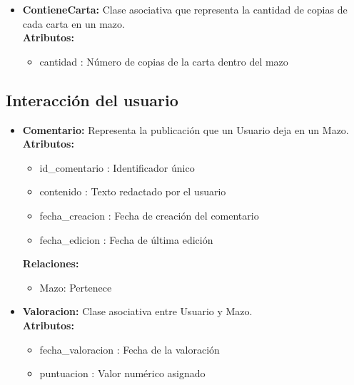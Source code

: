 \documentclass[10pt]{article}
\begin{document}
\begin{itemize}
            \item \textbf{ContieneCarta:} Clase asociativa que representa la cantidad de copias de cada carta en un mazo.\\
            \textbf{Atributos:}
            \begin{itemize}
                \item cantidad : Número de copias de la carta dentro del mazo
            \end{itemize}
        \end{itemize}
        
        \subsection{Interacción del usuario}
        \begin{itemize}
            \item \textbf{Comentario:} Representa la publicación que un Usuario deja en un Mazo.\\
            \textbf{Atributos:}
            \begin{itemize}
                \item id\_comentario : Identificador único
                \item contenido : Texto redactado por el usuario
                \item fecha\_creacion : Fecha de creación del comentario
                \item fecha\_edicion : Fecha de última edición
            \end{itemize}
            \textbf{Relaciones:}
            \begin{itemize}
                \item Mazo: Pertenece
            \end{itemize}
            
            \item \textbf{Valoracion:} Clase asociativa entre Usuario y Mazo.\\
            \textbf{Atributos:}
            \begin{itemize}
                \item fecha\_valoracion : Fecha de la valoración
                \item puntuacion : Valor numérico asignado
            \end{itemize}
        \end{itemize}
        
\end{document}
